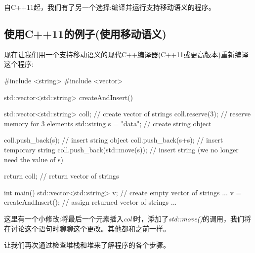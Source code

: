自C++11起，我们有了另一个选择:编译并运行支持移动语义的程序。

\subsection{使用C++11的例子(使用移动语义)}

现在让我们用一个支持移动语义的现代C++编译器(C++11或更高版本)重新编译这个程序:

\begin{cppcode}
#include <string>
#include <vector>

std::vector<std::string> createAndInsert()
{
	std::vector<std::string> coll; // create vector of strings
	coll.reserve(3); // reserve memory for 3 elements
	std::string s = "data"; // create string object
	
	coll.push_back(s); // insert string object
	coll.push_back(s+s); // insert temporary string
	coll.push_back(std::move(s)); // insert string (we no longer need the value of s)
	
	return coll; // return vector of strings
}

int main()
{
	std::vector<std::string> v; // create empty vector of strings
	...
	v = createAndInsert(); // assign returned vector of strings
	...
}
\end{cppcode}

这里有一个小修改:将最后一个元素插入\textit{coll}时，添加了\textit{std::move()}的调用，我们将在讨论这个语句时聊聊这个更改。其他都和之前一样。

让我们再次通过检查堆栈和堆来了解程序的各个步骤。

